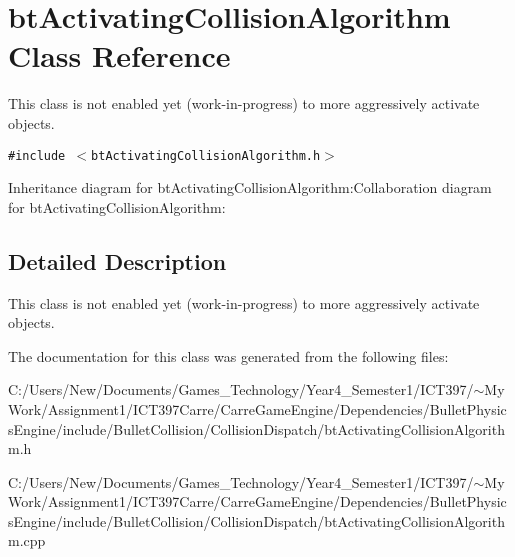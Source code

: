 \hypertarget{classbt_activating_collision_algorithm}{
\section{btActivatingCollisionAlgorithm Class Reference}
\label{classbt_activating_collision_algorithm}
}
This class is not enabled yet (work-in-progress) to more aggressively activate objects.  


{\tt \#include $<$btActivatingCollisionAlgorithm.h$>$}

Inheritance diagram for btActivatingCollisionAlgorithm:Collaboration diagram for btActivatingCollisionAlgorithm:

\subsection{Detailed Description}
This class is not enabled yet (work-in-progress) to more aggressively activate objects. 

The documentation for this class was generated from the following files:\begin{CompactItemize}
\item 
C:/Users/New/Documents/Games\_\-Technology/Year4\_\-Semester1/ICT397/$\sim$My Work/Assignment1/ICT397Carre/CarreGameEngine/Dependencies/BulletPhysicsEngine/include/BulletCollision/CollisionDispatch/btActivatingCollisionAlgorithm.h\item 
C:/Users/New/Documents/Games\_\-Technology/Year4\_\-Semester1/ICT397/$\sim$My Work/Assignment1/ICT397Carre/CarreGameEngine/Dependencies/BulletPhysicsEngine/include/BulletCollision/CollisionDispatch/btActivatingCollisionAlgorithm.cpp\end{CompactItemize}
